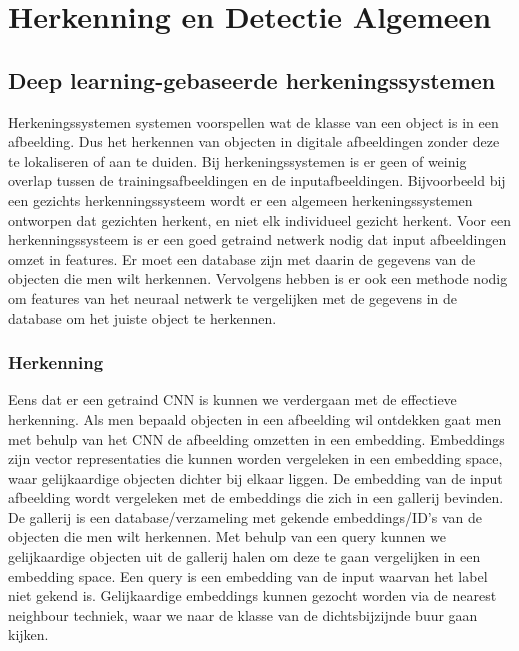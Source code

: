 \chapter{Herkenning en Detectie Algemeen}

\section{Deep learning-gebaseerde herkeningssystemen}
Herkeningssystemen systemen voorspellen wat de klasse van een object is in een afbeelding. 
Dus het herkennen van objecten in digitale afbeeldingen zonder deze te lokaliseren of aan te duiden. 
Bij herkeningssystemen is er geen of weinig overlap tussen de trainingsafbeeldingen en de inputafbeeldingen.
Bijvoorbeeld bij een gezichts herkenningssysteem wordt er een algemeen herkeningssystemen ontworpen dat gezichten herkent, en niet elk individueel gezicht herkent.
Voor een herkenningssysteem is er een goed getraind netwerk nodig dat input afbeeldingen omzet in features. 
Er moet een database zijn met daarin de gegevens van de objecten die men wilt herkennen. 
Vervolgens hebben is er ook een methode nodig om features van het neuraal netwerk te vergelijken met de gegevens in de database om het juiste object te herkennen.

\subsection{Herkenning}
Eens dat er een getraind CNN is kunnen we verdergaan met de effectieve herkenning. 
Als men bepaald objecten in een afbeelding wil ontdekken gaat men met behulp van het CNN de afbeelding omzetten in een embedding. 
Embeddings \cite{koehrsen_neural_2018} zijn vector representaties die kunnen worden vergeleken in een embedding space, waar gelijkaardige objecten dichter bij elkaar liggen. De embedding van de input afbeelding wordt vergeleken met de embeddings die zich in een gallerij bevinden. 
De gallerij is een database/verzameling met gekende embeddings/ID's van de objecten die men wilt herkennen.
Met behulp van een query kunnen we gelijkaardige objecten uit de gallerij halen om deze te gaan vergelijken in een embedding space. 
Een query is een embedding van de input waarvan het label niet gekend is.
Gelijkaardige embeddings kunnen gezocht worden via de nearest neighbour techniek, waar we naar de klasse van de dichtsbijzijnde buur gaan kijken.

